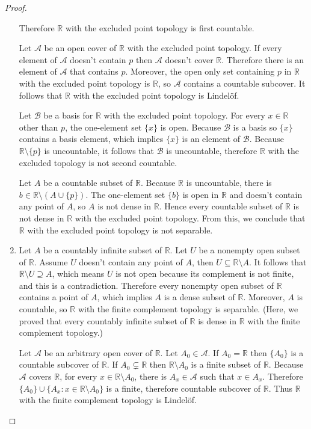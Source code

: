 \begin{proof}
\begin{enumerate}[label={(\alph*)}]
		      Therefore $\mathbb{R}$ with the excluded point topology is first countable.

		      Let $\mathscr{A}$ be an open cover of $\mathbb{R}$ with the excluded point topology. If every element of $\mathscr{A}$ doesn't contain $p$ then $\mathscr{A}$ doesn't cover $\mathbb{R}$. Therefore there is an element of $\mathscr{A}$ that contains $p$. Moreover, the open only set containing $p$ in $\mathbb{R}$ with the excluded point topology is $\mathbb{R}$, so $\mathscr{A}$ contains a countable subcover. It follows that $\mathbb{R}$ with the excluded point topology is Lindelöf.

		      Let $\mathscr{B}$ be a basis for $\mathbb{R}$ with the excluded point topology. For every $x\in\mathbb{R}$ other than $p$, the one-element set $\{ x \}$ is open. Because $\mathscr{B}$ is a basis so $\{ x \}$ contains a basis element, which implies $\{ x \}$ is an element of $\mathscr{B}$. Because $\mathbb{R}\setminus\{p\}$ is uncountable, it follows that $\mathscr{B}$ is uncountable, therefore $\mathbb{R}$ with the excluded topology is not second countable.

		      Let $A$ be a countable subset of $\mathbb{R}$. Because $\mathbb{R}$ is uncountable, there is $b\in\mathbb{R}\setminus (A\cup\{p\})$. The one-element set $\{b\}$ is open in $\mathbb{R}$ and doesn't contain any point of $A$, so $A$ is not dense in $\mathbb{R}$. Hence every countable subset of $\mathbb{R}$ is not dense in $\mathbb{R}$ with the excluded point topology. From this, we conclude that $\mathbb{R}$ with the excluded point topology is not separable.
		\item Let $A$ be a countably infinite subset of $\mathbb{R}$. Let $U$ be a nonempty open subset of $\mathbb{R}$. Assume $U$ doesn't contain any point of $A$, then $U\subseteq \mathbb{R}\setminus A$. It follows that $\mathbb{R}\setminus U \supseteq A$, which means $U$ is not open because its complement is not finite, and this is a contradiction. Therefore every nonempty open subset of $\mathbb{R}$ contains a point of $A$, which implies $A$ is a dense subset of $\mathbb{R}$. Moreover, $A$ is countable, so $\mathbb{R}$ with the finite complement topology is separable. (Here, we proved that every countably infinite subset of $\mathbb{R}$ is dense in $\mathbb{R}$ with the finite complement topology.)

		      Let $\mathscr{A}$ be an arbitrary open cover of $\mathbb{R}$. Let $A_{0}\in\mathscr{A}$. If $A_{0} = \mathbb{R}$ then $\{A_{0}\}$ is a countable subcover of $\mathbb{R}$. If $A_{0}\subsetneq \mathbb{R}$ then $\mathbb{R}\setminus A_{0}$ is a finite subset of $\mathbb{R}$. Because $\mathscr{A}$ covers $\mathbb{R}$, for every $x\in \mathbb{R}\setminus A_{0}$, there is $A_{x}\in\mathscr{A}$ such that $x\in A_{x}$. Therefore $\{ A_{0} \} \cup \{ A_{x} : x\in \mathbb{R}\setminus A_{0} \}$ is a finite, therefore countable subcover of $\mathbb{R}$. Thus $\mathbb{R}$ with the finite complement topology is Lindelöf.


\end{enumerate}
\end{proof}
